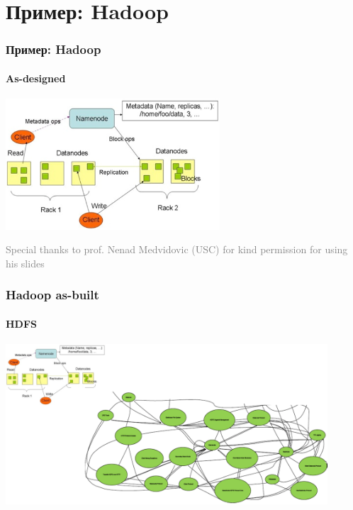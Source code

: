 \documentclass{../../slides-style}
\begin{document}
    \section{Пример: Hadoop}

    \begin{frame}
        \frametitle{Пример: Hadoop}
        \framesubtitle{As-designed}
        \begin{center}
            \includegraphics[width=0.6\textwidth]{hadoopPrescriptive.png}
        \end{center}
        \begin{scriptsize}\textcolor{gray}{Special thanks to prof. Nenad Medvidovic (USC) for kind permission for using his slides}\end{scriptsize}
    \end{frame}

    \begin{frame}
        \frametitle{Hadoop as-built}
        \framesubtitle{HDFS}
        \begin{center}
            \includegraphics[width=0.9\textwidth]{hadoopDescriptive.png}
        \end{center}
    \end{frame}
\end{document}
